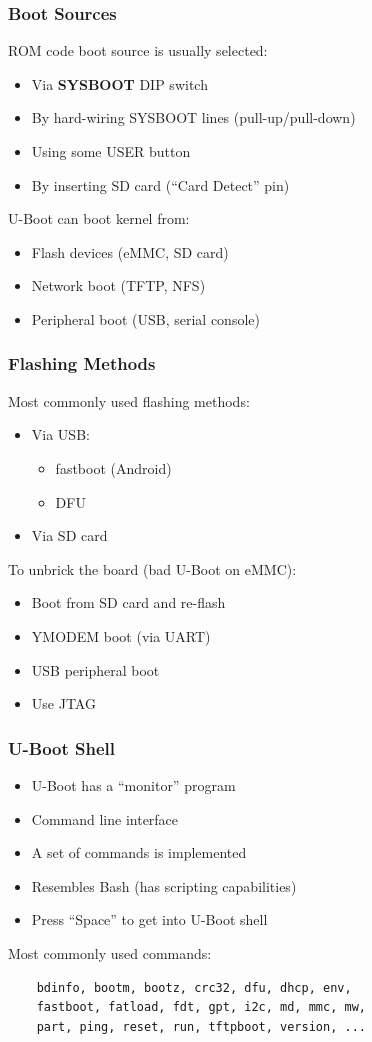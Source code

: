 \documentclass[aspectratio=169]{beamer}
\begin{document}
\begin{frame}
  \frametitle{Boot Sources}
  ROM code boot source is usually selected:
  \begin{itemize}
  \item Via \textbf{SYSBOOT} DIP switch
  \item By hard-wiring SYSBOOT lines (pull-up/pull-down)
  \item Using some USER button
  \item By inserting SD card (``Card Detect'' pin)
  \end{itemize}
  \pause
  U-Boot can boot kernel from:
  \begin{itemize}
  \item Flash devices (eMMC, SD card)
  \item Network boot (TFTP, NFS)
  \item Peripheral boot (USB, serial console)
  \end{itemize}
\end{frame}

\begin{frame}
  \frametitle{Flashing Methods}
  Most commonly used flashing methods:
  \begin{itemize}
  \item Via USB:
    \begin{itemize}
    \item fastboot (Android)
    \item DFU
    \end{itemize}
  \item Via SD card
  \end{itemize}
  \pause
  To unbrick the board (bad U-Boot on eMMC):
  \begin{itemize}
  \item Boot from SD card and re-flash
  \item YMODEM boot (via UART)
  \item USB peripheral boot
  \item Use JTAG
  \end{itemize}
\end{frame}

\begin{frame}[fragile]
  \frametitle{U-Boot Shell}
  \begin{itemize}
  \item U-Boot has a ``monitor'' program
  \item Command line interface
  \item A set of commands is implemented
  \item Resembles Bash (has scripting capabilities)
  \item Press ``Space'' to get into U-Boot shell
  \end{itemize}
  \pause
  Most commonly used commands:
  \begin{verbatim}
    bdinfo, bootm, bootz, crc32, dfu, dhcp, env,
    fastboot, fatload, fdt, gpt, i2c, md, mmc, mw,
    part, ping, reset, run, tftpboot, version, ...
  \end{verbatim}
\end{frame}
\end{document}
